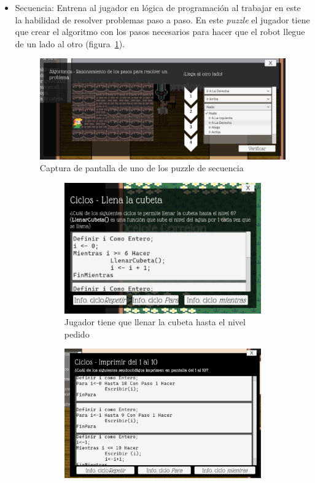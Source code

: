 \begin{itemize}
    \item Secuencia: Entrena al jugador en lógica de programación al trabajar en este la habilidad de resolver problemas paso a paso. En este \textit{puzzle} el jugador tiene que crear el algoritmo con los pasos necesarios para hacer que el robot llegue de un lado al otro (figura~\ref{fig:puzzle_secuencia}).
    \begin{figure}[H]
        \centering
        \includegraphics[width=0.5\linewidth]{images/PuzzleSecuencia.png}
        \caption{Captura de pantalla de uno de los puzzle de secuencia}
        \label{fig:puzzle_secuencia}
    \end{figure}
    \begin{figure}[H]
            \centering
        \begin{subfigure}{0.4\textwidth}
            \centering
            \includegraphics[width=\textwidth]{images/OpcionMultiple1.png}
            \caption{Jugador tiene que llenar la cubeta hasta el nivel pedido}
            \label{fig:puzzle_completar_ciclos_for}
        \end{subfigure}
        \begin{subfigure}{0.4\textwidth}
            \centering
            \includegraphics[width=\textwidth]{images/OpcionMultiple2.png}

\end{subfigure}
\end{figure}
\end{itemize}
